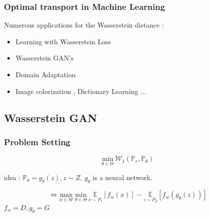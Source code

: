 \documentclass[french,9pt]{beamer}
\begin{document}
\begin{frame}
  \frametitle{Optimal transport in Machine Learning}
  
Numerous applications for the Wasserstein distance :

 \begin{itemize}
 \item Learning with Wasserstein Loss \cite{2015arXiv150605439F} 
 \item Wasserstein GAN's \cite{arjovsky_wgan_2017}
\item Domain Adaptation \cite{courty2017optimal}
\item Image colorization \cite{ferradans2014regularized}, Dictionary Learning \cite{pmlr-v51-rolet16} ... 
 \end{itemize}


\end{frame}



\subsection{Wasserstein GAN}

\begin{frame}
\frametitle{Problem Setting \cite{arjovsky_wgan_2017}}

$$\underset{\theta \in \Theta}{\text{min}} \  \mathcal{W}_{1}(\mathbb{P}_{r},\mathbb{P}_{\theta}) $$

idea : $\mathbb{P}_{\theta}=g_{\theta}(z), z \sim Z$, $g_{\theta}$ is a neural network.

$$ \iff \underset{w \in \mathcal{W}}{\text{max}} \ \underset{\theta \in \Theta}{\text{min}} \  \underset{x \sim P_{r}}{\mathbb{E}}[f_{w}(x)]- \underset{z \sim P_{Z}}{\mathbb{E}}[f_{w}(g_{\theta}(z))]$$
$f_{w}=D,g_{\theta}=G$
\end{frame}

\end{document}
